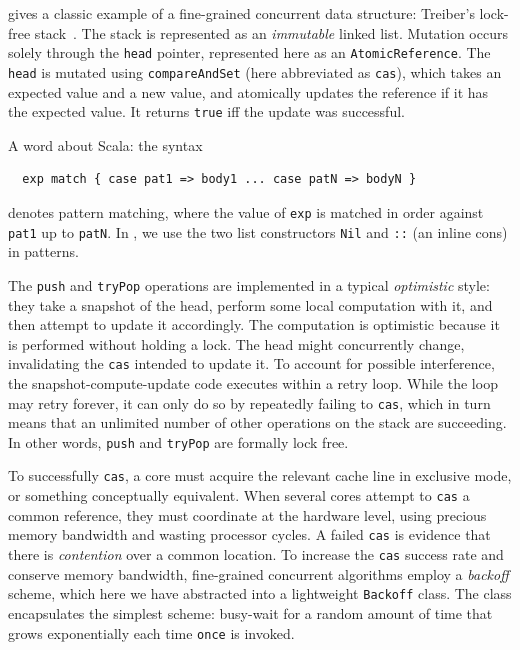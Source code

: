 \documentclass[preprint,nocopyrightspace]{sigplanconf}
\begin{document}
 gives a classic example of a fine-grained concurrent
data structure: Treiber's lock-free stack~\cite{Treiber1986}.  The stack is
represented as an \emph{immutable} linked list.  Mutation occurs solely through
the \lstinline{head} pointer, represented here as an
\lstinline{AtomicReference}.  The \lstinline{head} is mutated using
\lstinline{compareAndSet} (here abbreviated as \lstinline{cas}), which takes an
expected value and a new value, and atomically updates the reference if it has
the expected value.  It returns \lstinline{true} iff the update was successful.

A word about Scala: the syntax 
\begin{lstlisting}
  exp match { case pat1 => body1 ... case patN => bodyN }
\end{lstlisting}
denotes pattern matching, where the value of \lstinline{exp} is matched in order
against \lstinline{pat1} up to \lstinline{patN}.  In ,
we use the two list constructors \lstinline{Nil} and \lstinline{::} (an inline
cons) in patterns.

The \lstinline{push} and \lstinline{tryPop} operations are implemented in a
typical \emph{optimistic} style: they take a snapshot of the head, perform some
local computation with it, and then attempt to update it accordingly.  The
computation is optimistic because it is performed without holding a lock.  The
head might concurrently change, invalidating the \lstinline{cas} intended to
update it.  To account for possible interference, the snapshot-compute-update
code executes within a retry loop.  While the loop may retry forever, it can
only do so by repeatedly failing to \lstinline{cas}, which in turn means that an
unlimited number of other operations on the stack are succeeding.  In other
words, \lstinline{push} and \lstinline{tryPop} are formally lock
  free.

To successfully \lstinline{cas}, a core must acquire the relevant cache line in
exclusive mode, or something conceptually equivalent.  When
several cores attempt to \lstinline{cas} a common reference, they must
coordinate at the hardware level, using precious memory bandwidth and wasting
processor cycles.  A failed \lstinline{cas} is evidence that there is
\emph{contention} over a common location.  To increase the \lstinline{cas}
success rate and conserve memory bandwidth, fine-grained concurrent algorithms
employ a \emph{backoff} scheme, which here we have abstracted into a lightweight
\lstinline{Backoff} class.  The class encapsulates the simplest scheme:
busy-wait for a random amount of time that grows exponentially each time
\lstinline{once} is invoked.  
\end{document}
